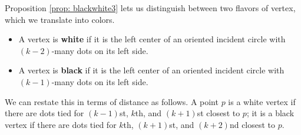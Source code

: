 \documentclass[11pt,oneside]{amsart}
\newtheorem{lemma}[thm]{Lemma}
\newtheorem{prop}[thm]{Proposition}
\theoremstyle{definition}
\theoremstyle{remark}
\numberwithin{equation}{section}
\begin{document}










Proposition \ref{prop: blackwhite3} lets us distinguish between two flavors of vertex, which we translate into colors. %
\begin{itemize}
    \item A vertex is \textbf{white} if it is the left center of an oriented incident circle with $(k-2)$-many dots on its left side.
    \item A vertex is \textbf{black} if it is the left center of an oriented incident circle with $(k-1)$-many dots on its left side.
\end{itemize}
We can restate this in terms of distance as follows. A point $p$ is a white vertex if there are dots tied for $(k-1)$st, $k$th, and $(k+1)$st closest to $p$; it is a black vertex if there are dots tied for $k$th, $(k+1)$st, and $(k+2)$nd closest to $p$.
\end{document}
